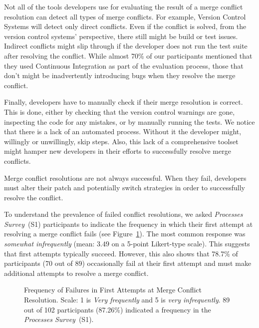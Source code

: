 Not all of the tools developers use for evaluating the result of a merge conflict resolution can detect all types of merge conflicts.
For example, Version Control Systems will detect only direct conflicts.
Even if the conflict is solved, from the version control systems' perspective, there still might be build or test issues.
Indirect conflicts might slip through if the developer does not run the test suite after resolving the conflict.
While almost 70\% of our participants mentioned that they used Continuous Integration as part of the evaluation process, those that don't might be inadvertently introducing bugs when they resolve the merge conflict.

Finally, developers have to manually check if their merge resolution is correct.
This is done, either by checking that the version control warnings are gone, inspecting the code for any mistakes, or by manually running the tests.
We notice that there is a lack of an automated process.
Without it the developer might, willingly or unwillingly, skip steps.
Also, this lack of a comprehensive toolset might hamper new developers in their efforts to successfully resolve merge conflicts.


Merge conflict resolutions are not always successful.
When they fail, developers must alter their patch and potentially switch strategies in order to successfully resolve the conflict.

To understand the prevalence of failed conflict resolutions, we asked \textit{Processes Survey}~(S1) participants to indicate the frequency in which their first attempt at resolving a merge conflict fails (see Figure~\ref{fig:first-attempt-failure}).
The most common response was \textit{somewhat infrequently} (mean: $3.49$ on a 5-point Likert-type scale).
This suggests that first attempts typically succeed.
However, this also shows that 78.7\% of participants (70 out of 89) occasionally fail at their first attempt and must make additional attempts to resolve a merge conflict.

\begin{figure}
	\centering
	\caption{Frequency of Failures in First Attempts at Merge Conflict Resolution. Scale: 1 is \textit{Very frequently} and 5 is \textit{very infrequently}. 89 out of 102 participants (87.26\%) indicated a frequency in the \textit{Processes Survey}~(S1).\vspace*{-0.3\baselineskip}}
	\label{fig:first-attempt-failure}
\end{figure}

